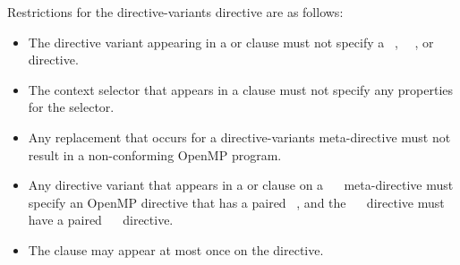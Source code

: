 \restrictions
Restrictions for the directive-variants directive are as follows:

\begin{itemize}
    \item The directive variant appearing in a  or 
        clause must not specify a ~,
        ~~, or
        ~~ directive.

    \item The context selector that appears in a  clause must not
        specify any properties for the  selector.

    \item Any replacement that occurs for a directive-variants meta-directive must
        not result in a non-conforming OpenMP program.

    \item Any directive variant that appears in a  or 
        clause on a ~~
        meta-directive must specify an OpenMP directive that has a paired ~, and
        the ~~ directive must have a paired
        ~~ directive.

    \item The  clause may appear at most once on the directive.
\end{itemize}
